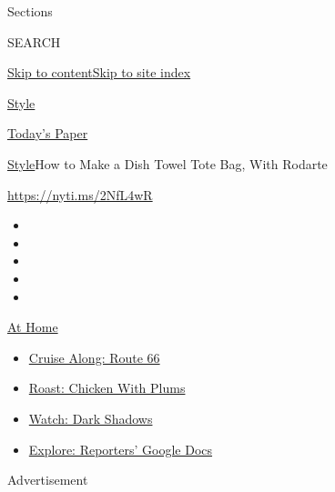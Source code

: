 Sections

SEARCH

\protect\hyperlink{site-content}{Skip to
content}\protect\hyperlink{site-index}{Skip to site index}

\href{https://www.nytimes3xbfgragh.onion/section/style}{Style}

\href{https://myaccount.nytimes3xbfgragh.onion/auth/login?response_type=cookie\&client_id=vi}{}

\href{https://www.nytimes3xbfgragh.onion/section/todayspaper}{Today's
Paper}

\href{/section/style}{Style}\textbar{}How to Make a Dish Towel Tote Bag,
With Rodarte

\url{https://nyti.ms/2NfL4wR}

\begin{itemize}
\item
\item
\item
\item
\item
\end{itemize}

\href{https://www.nytimes3xbfgragh.onion/spotlight/at-home?action=click\&pgtype=Article\&state=default\&region=TOP_BANNER\&context=at_home_menu}{At
Home}

\begin{itemize}
\tightlist
\item
  \href{https://www.nytimes3xbfgragh.onion/2020/09/07/travel/route-66.html?action=click\&pgtype=Article\&state=default\&region=TOP_BANNER\&context=at_home_menu}{Cruise
  Along: Route 66}
\item
  \href{https://www.nytimes3xbfgragh.onion/2020/09/04/dining/sheet-pan-chicken.html?action=click\&pgtype=Article\&state=default\&region=TOP_BANNER\&context=at_home_menu}{Roast:
  Chicken With Plums}
\item
  \href{https://www.nytimes3xbfgragh.onion/2020/09/04/arts/television/dark-shadows-stream.html?action=click\&pgtype=Article\&state=default\&region=TOP_BANNER\&context=at_home_menu}{Watch:
  Dark Shadows}
\item
  \href{https://www.nytimes3xbfgragh.onion/interactive/2020/at-home/even-more-reporters-editors-diaries-lists-recommendations.html?action=click\&pgtype=Article\&state=default\&region=TOP_BANNER\&context=at_home_menu}{Explore:
  Reporters' Google Docs}
\end{itemize}

Advertisement

